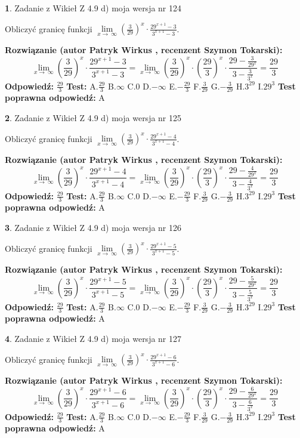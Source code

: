 \documentclass[12pt, a4paper]{article}
\theoremstyle{definition} %
\newtheorem{zad}{}
\newcommand{\zadStart}[1]{\begin{zad}#1\newline}
\newcommand{\zadStop}{\end{zad}}
\newcommand{\rozwStart}[2]{\noindent \textbf{Rozwiązanie (autor #1 , recenzent #2): }\newline}
\newcommand{\rozwStop}{\newline}
\newcommand{\odpStart}{\noindent \textbf{Odpowiedź:}\newline}
\newcommand{\odpStop}{\newline}
\newcommand{\testStart}{\noindent \textbf{Test:}\newline}
\newcommand{\testStop}{\newline}
\newcommand{\kluczStart}{\noindent \textbf{Test poprawna odpowiedź:}\newline}
\newcommand{\kluczStop}{\newline}
\begin{document}
\zadStart{Zadanie z Wikieł Z 4.9 d) moja wersja nr 124}


Obliczyć granicę funkcji  $\lim\limits_{x\to\ \infty}(\frac{3}{29})^{x}\cdot\frac{29^{x+1}-3}{3^{x+1}-3}$.
\zadStop
\rozwStart{Patryk Wirkus}{Szymon Tokarski}
$$\lim\limits_{x\to\ \infty}(\frac{3}{29})^{x}\cdot\frac{29^{x+1}-3}{3^{x+1}-3}=\lim\limits_{x\to\ \infty}(\frac{3}{29})^{x}\cdot(\frac{29}{3})^{x} \cdot \frac{29-\frac{3}{29^{x}}}{3-\frac{3}{3^{x}}} = \frac{29}{3}$$
\rozwStop
\odpStart
$\frac{29}{3}$
\odpStop
\testStart
A.$\frac{29}{3}$ B.$\infty$ C.$0$ D.$-\infty$ E.$-\frac{29}{3}$
F.$\frac{3}{29}$ G.$-\frac{3}{29}$
H.$3^{29}$
I.$29^{3}$
\testStop
\kluczStart
A
\kluczStop



\zadStart{Zadanie z Wikieł Z 4.9 d) moja wersja nr 125}


Obliczyć granicę funkcji  $\lim\limits_{x\to\ \infty}(\frac{3}{29})^{x}\cdot\frac{29^{x+1}-4}{3^{x+1}-4}$.
\zadStop
\rozwStart{Patryk Wirkus}{Szymon Tokarski}
$$\lim\limits_{x\to\ \infty}(\frac{3}{29})^{x}\cdot\frac{29^{x+1}-4}{3^{x+1}-4}=\lim\limits_{x\to\ \infty}(\frac{3}{29})^{x}\cdot(\frac{29}{3})^{x} \cdot \frac{29-\frac{4}{29^{x}}}{3-\frac{4}{3^{x}}} = \frac{29}{3}$$
\rozwStop
\odpStart
$\frac{29}{3}$
\odpStop
\testStart
A.$\frac{29}{3}$ B.$\infty$ C.$0$ D.$-\infty$ E.$-\frac{29}{3}$
F.$\frac{3}{29}$ G.$-\frac{3}{29}$
H.$3^{29}$
I.$29^{3}$
\testStop
\kluczStart
A
\kluczStop



\zadStart{Zadanie z Wikieł Z 4.9 d) moja wersja nr 126}


Obliczyć granicę funkcji  $\lim\limits_{x\to\ \infty}(\frac{3}{29})^{x}\cdot\frac{29^{x+1}-5}{3^{x+1}-5}$.
\zadStop
\rozwStart{Patryk Wirkus}{Szymon Tokarski}
$$\lim\limits_{x\to\ \infty}(\frac{3}{29})^{x}\cdot\frac{29^{x+1}-5}{3^{x+1}-5}=\lim\limits_{x\to\ \infty}(\frac{3}{29})^{x}\cdot(\frac{29}{3})^{x} \cdot \frac{29-\frac{5}{29^{x}}}{3-\frac{5}{3^{x}}} = \frac{29}{3}$$
\rozwStop
\odpStart
$\frac{29}{3}$
\odpStop
\testStart
A.$\frac{29}{3}$ B.$\infty$ C.$0$ D.$-\infty$ E.$-\frac{29}{3}$
F.$\frac{3}{29}$ G.$-\frac{3}{29}$
H.$3^{29}$
I.$29^{3}$
\testStop
\kluczStart
A
\kluczStop



\zadStart{Zadanie z Wikieł Z 4.9 d) moja wersja nr 127}


Obliczyć granicę funkcji  $\lim\limits_{x\to\ \infty}(\frac{3}{29})^{x}\cdot\frac{29^{x+1}-6}{3^{x+1}-6}$.
\zadStop
\rozwStart{Patryk Wirkus}{Szymon Tokarski}
$$\lim\limits_{x\to\ \infty}(\frac{3}{29})^{x}\cdot\frac{29^{x+1}-6}{3^{x+1}-6}=\lim\limits_{x\to\ \infty}(\frac{3}{29})^{x}\cdot(\frac{29}{3})^{x} \cdot \frac{29-\frac{6}{29^{x}}}{3-\frac{6}{3^{x}}} = \frac{29}{3}$$
\rozwStop
\odpStart
$\frac{29}{3}$
\odpStop
\testStart
A.$\frac{29}{3}$ B.$\infty$ C.$0$ D.$-\infty$ E.$-\frac{29}{3}$
F.$\frac{3}{29}$ G.$-\frac{3}{29}$
H.$3^{29}$
I.$29^{3}$
\testStop
\kluczStart
A
\kluczStop
\end{document}
